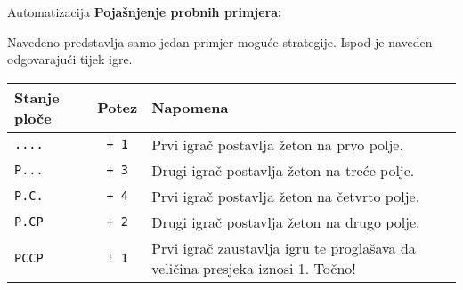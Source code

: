 \begin{statement}[
  problempoints=100,
  timelimit=1 sekunda,
  memorylimit=512 MiB,
]{Automatizacija}
\textbf{Pojašnjenje probnih primjera:} 

Navedeno predstavlja samo jedan primjer moguće strategije. 
Ispod je naveden odgovarajući tijek igre. 

{\renewcommand{\arraystretch}{1.4}
  \setlength{\tabcolsep}{6pt}
  \begin{tabular}{lcl}
    Stanje ploče & Potez & Napomena \\ \midrule
    \texttt{....} & \texttt{+ 1} & Prvi igrač postavlja žeton na prvo polje. \\
    \texttt{P...} & \texttt{+ 3} & Drugi igrač postavlja žeton na treće polje. \\
    \texttt{P.C.} & \texttt{+ 4} & Prvi igrač postavlja žeton na četvrto polje. \\
    \texttt{P.CP} & \texttt{+ 2} & Drugi igrač postavlja žeton na drugo polje. \\
    \texttt{PCCP} & \texttt{\frenchspacing! 1} & Prvi igrač zaustavlja igru te 
    proglašava da veličina presjeka iznosi 1. Točno! \\

\end{tabular}}

\end{statement}

